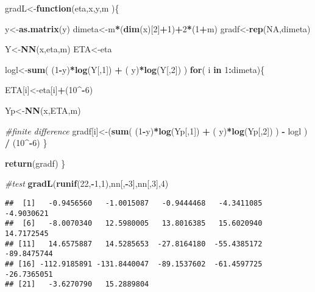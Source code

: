 \documentclass[]{article}
\newenvironment{Shaded}{\begin{snugshade}}{\end{snugshade}}
\newcommand{\KeywordTok}[1]{\textcolor[rgb]{0.13,0.29,0.53}{\textbf{#1}}}
\newcommand{\DecValTok}[1]{\textcolor[rgb]{0.00,0.00,0.81}{#1}}
\newcommand{\StringTok}[1]{\textcolor[rgb]{0.31,0.60,0.02}{#1}}
\newcommand{\CommentTok}[1]{\textcolor[rgb]{0.56,0.35,0.01}{\textit{#1}}}
\newcommand{\OtherTok}[1]{\textcolor[rgb]{0.56,0.35,0.01}{#1}}
\newcommand{\ControlFlowTok}[1]{\textcolor[rgb]{0.13,0.29,0.53}{\textbf{#1}}}
\newcommand{\OperatorTok}[1]{\textcolor[rgb]{0.81,0.36,0.00}{\textbf{#1}}}
\newcommand{\NormalTok}[1]{#1}
\begin{document}
\begin{Shaded}
\begin{Highlighting}[]
\NormalTok{gradL<-}\ControlFlowTok{function}\NormalTok{(eta,x,y,m )\{}
        
\NormalTok{    y<-}\KeywordTok{as.matrix}\NormalTok{(y)}
\NormalTok{    dimeta<-m}\OperatorTok{*}\NormalTok{(}\KeywordTok{dim}\NormalTok{(x)[}\DecValTok{2}\NormalTok{]}\OperatorTok{+}\DecValTok{1}\NormalTok{)}\OperatorTok{+}\DecValTok{2}\OperatorTok{*}\NormalTok{(}\DecValTok{1}\OperatorTok{+}\NormalTok{m)}
\NormalTok{    gradf<-}\KeywordTok{rep}\NormalTok{(}\OtherTok{NA}\NormalTok{,dimeta)}

\NormalTok{    Y<-}\KeywordTok{NN}\NormalTok{(x,eta,m)}
\NormalTok{    ETA<-eta}

\NormalTok{    logl<-}\KeywordTok{sum}\NormalTok{( (}\DecValTok{1}\OperatorTok{-}\NormalTok{y)}\OperatorTok{*}\KeywordTok{log}\NormalTok{(Y[,}\DecValTok{1}\NormalTok{]) }\OperatorTok{+}\StringTok{ }\NormalTok{( y)}\OperatorTok{*}\KeywordTok{log}\NormalTok{(Y[,}\DecValTok{2}\NormalTok{])  )}
    \ControlFlowTok{for}\NormalTok{( i }\ControlFlowTok{in} \DecValTok{1}\OperatorTok{:}\NormalTok{dimeta)\{}
        
\NormalTok{        ETA[i]<-eta[i]}\OperatorTok{+}\NormalTok{(}\DecValTok{10}\OperatorTok{^-}\DecValTok{6}\NormalTok{)}
            
\NormalTok{        Yp<-}\KeywordTok{NN}\NormalTok{(x,ETA,m)}
        
        \CommentTok{#finite difference}
\NormalTok{        gradf[i]<-(}\KeywordTok{sum}\NormalTok{( (}\DecValTok{1}\OperatorTok{-}\NormalTok{y)}\OperatorTok{*}\KeywordTok{log}\NormalTok{(Yp[,}\DecValTok{1}\NormalTok{]) }\OperatorTok{+}\StringTok{ }\NormalTok{( y)}\OperatorTok{*}\KeywordTok{log}\NormalTok{(Yp[,}\DecValTok{2}\NormalTok{])  ) }\OperatorTok{-}\StringTok{ }\NormalTok{logl  ) }\OperatorTok{/}\StringTok{ }\NormalTok{(}\DecValTok{10}\OperatorTok{^-}\DecValTok{6}\NormalTok{) \}}
    
    \KeywordTok{return}\NormalTok{(gradf)}
\NormalTok{\}}

\CommentTok{#test}
\KeywordTok{gradL}\NormalTok{(}\KeywordTok{runif}\NormalTok{(}\DecValTok{22}\NormalTok{,}\OperatorTok{-}\DecValTok{1}\NormalTok{,}\DecValTok{1}\NormalTok{),nn[,}\OperatorTok{-}\DecValTok{3}\NormalTok{],nn[,}\DecValTok{3}\NormalTok{],}\DecValTok{4}\NormalTok{)}
\end{Highlighting}
\end{Shaded}

\begin{verbatim}
##  [1]   -0.9456560   -1.0015087   -0.9444468   -4.3411085   -4.9030621
##  [6]   -8.0070340   12.5980005   13.8016385   15.6020940   14.7172545
## [11]   14.6575887   14.5285653  -27.8164180  -55.4385172  -89.8475744
## [16] -112.9185891 -131.8440047  -89.1537602  -61.4597725  -26.7365051
## [21]   -3.6270790   15.2889804
\end{verbatim}
\end{document}
